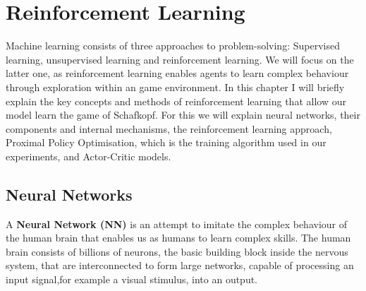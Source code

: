 \chapter{Reinforcement Learning}
Machine learning consists of three approaches to problem-solving: Supervised learning, unsupervised learning and
reinforcement learning.
We will focus on the latter one, as reinforcement learning enables agents to learn complex behaviour through
exploration within an game environment.
In this chapter I will briefly explain the key concepts and methods of reinforcement learning that allow our model
learn the game of Schafkopf.
For this we will explain neural networks, their components and internal mechanisms, the reinforcement learning approach,
Proximal Policy Optimisation, which is the training algorithm used in our experiments, and Actor-Critic models.

\section{Neural Networks}
A \textbf{Neural Network (NN)} is an attempt to imitate the complex behaviour of the human brain that
enables us as humans to learn complex skills.
The human brain consists of billions of neurons, the basic building block inside the nervous system, that are
interconnected to form large networks, capable of processing an input signal,for example a visual stimulus, into an
output.\\


